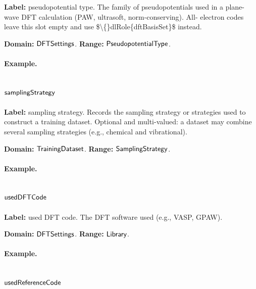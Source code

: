 \textbf{Label:} pseudopotential type.
The family of pseudopotentials used in a plane-wave DFT calculation (PAW, ultrasoft, norm-conserving). All- electron codes leave this slot empty and use \$\textbackslash\{\}dlRole\{dftBasisSet\}\$ instead.

\textbf{Domain:} $\mathsf{DFTSettings}$.
\textbf{Range:} $\mathsf{PseudopotentialType}$.

\paragraph{Example.}

\subsection{$\mathsf{samplingStrategy}$}
\label{sec:term-samplingStrategy}

\textbf{Label:} sampling strategy.
Records the sampling strategy or strategies used to construct a training dataset. Optional and multi-valued: a dataset may combine several sampling strategies (e.g., chemical and vibrational).

\textbf{Domain:} $\mathsf{TrainingDataset}$.
\textbf{Range:} $\mathsf{SamplingStrategy}$.

\paragraph{Example.}

\subsection{$\mathsf{usedDFTCode}$}
\label{sec:term-usedDFTCode}

\textbf{Label:} used DFT code.
The DFT software used (e.g., VASP, GPAW).

\textbf{Domain:} $\mathsf{DFTSettings}$.
\textbf{Range:} $\mathsf{Library}$.

\paragraph{Example.}

\subsection{$\mathsf{usedReferenceCode}$}
\label{sec:term-usedReferenceCode}

